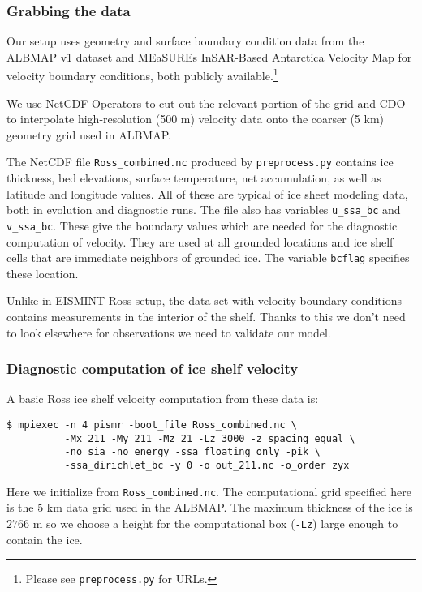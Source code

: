 \subsubsection*{Grabbing the data}

Our setup uses geometry and surface boundary condition data from the ALBMAP v1 dataset \cite{LeBrocqetal2010} and MEaSUREs InSAR-Based Antarctica Velocity Map \cite{Rignot09092011} for velocity boundary conditions, both publicly available.\footnote{Please see \texttt{preprocess.py} for URLs.}

We use NetCDF Operators to cut out the relevant portion of the grid and CDO to interpolate high-resolution (500 m) velocity data onto the coarser (5 km) geometry grid used in ALBMAP.

The NetCDF file \texttt{Ross_combined.nc} produced by \texttt{preprocess.py} contains ice thickness, bed elevations, surface temperature, net accumulation, as well as latitude and longitude values.  All of these are typical of ice sheet modeling data, both in evolution and diagnostic runs.  The file also has variables \texttt{u_ssa_bc} and \texttt{v_ssa_bc}.  These give the boundary values which are needed for the diagnostic computation of velocity. They are used at all grounded locations and ice shelf cells that are immediate neighbors of grounded ice.
The variable \texttt{bcflag} specifies these location.

Unlike in EISMINT-Ross setup, the data-set with velocity boundary conditions contains measurements in the interior of the shelf. Thanks to this we don't need to look elsewhere for observations we need to validate our model.

\subsubsection*{Diagnostic computation of ice shelf velocity}
A basic Ross ice shelf velocity computation from these data is:

\begin{verbatim}
$ mpiexec -n 4 pismr -boot_file Ross_combined.nc \
          -Mx 211 -My 211 -Mz 21 -Lz 3000 -z_spacing equal \
          -no_sia -no_energy -ssa_floating_only -pik \
          -ssa_dirichlet_bc -y 0 -o out_211.nc -o_order zyx
\end{verbatim}%
Here we initialize from \texttt{Ross_combined.nc}. The computational grid specified here is the $5$ km data grid used in the ALBMAP.  The maximum thickness of the ice is $2766$ m so we choose a height for the computational box (\texttt{-Lz}) large enough to contain the ice.

